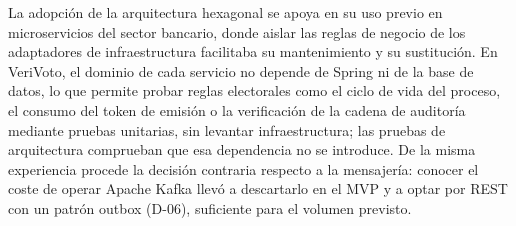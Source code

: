 La adopción de la arquitectura hexagonal se apoya en su uso previo en
microservicios del sector bancario, donde aislar las reglas de negocio de los
adaptadores de infraestructura facilitaba su mantenimiento y su sustitución.
En VeriVoto, el dominio de cada servicio no depende de Spring ni de la base de
datos, lo que permite probar reglas electorales como el ciclo de vida del
proceso, el consumo del token de emisión o la verificación de la cadena de
auditoría mediante pruebas unitarias, sin levantar infraestructura; las pruebas
de arquitectura comprueban que esa dependencia no se introduce. De la misma
experiencia procede la decisión contraria respecto a la mensajería: conocer el
coste de operar Apache Kafka llevó a descartarlo en el MVP y a optar por REST
con un patrón outbox (D-06), suficiente para el volumen previsto.
